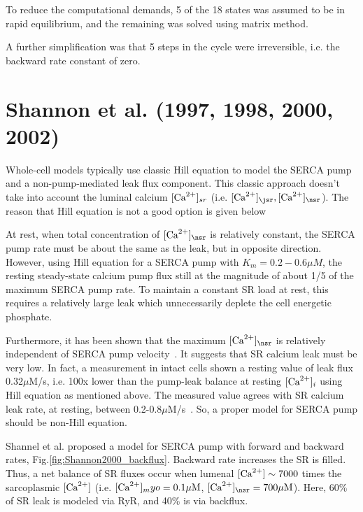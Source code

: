 To reduce the computational demands, 5 of the 18 states was assumed to
be in rapid equilibrium, and the remaining was solved using matrix
method. 

A further simplification was that 5 steps in the cycle were
irreversible, i.e. the backward rate constant of zero. 

\section{Shannon et al. (1997, 1998, 2000, 2002)}
\label{sec:shannon-et-al}

Whole-cell models typically use classic Hill equation to model the SERCA pump
and a non-pump-mediated leak flux component. This classic approach doesn't take
into account the luminal calcium $[{\text{Ca}^{2+}}]_{sr}$ (i.e. $[\Ca]_\jsr,[\Ca]_\nsr$).
The reason that Hill equation is not a good option is given below

\begin{framed}
  At rest, when total concentration of $[\Ca]_\nsr$ is relatively
  constant, the SERCA pump rate must be about the same as the leak,
  but in opposite direction. However, using Hill equation for a SERCA
  pump with $K_m=0.2-0.6\mu M$, the resting steady-state calcium pump
  flux still at the magnitude of about 1/5 of the maximum SERCA pump
  rate. To maintain a constant SR load at rest, this requires a
  relatively large leak which unnecessarily deplete the cell energetic
  phosphate.  
  
  Furthermore, it has been shown that the maximum $[\Ca]_\nsr$ is relatively
  independent of  SERCA pump velocity~\citep{ginsburg1998}. It suggests that SR 
  calcium leak must be very low. In fact, a measurement in intact  cells shown a
  resting value of leak flux 0.32$\mu$M/s, i.e. 100x  lower than the pump-leak
  balance at resting $[{\text{Ca}^{2+}}]_i$ using Hill equation as mentioned above. The
  measured value agrees with SR calcium leak rate, at resting, between
  0.2-0.8$\mu$M/s~\citep{cheng1993cse}. So, a proper model for SERCA pump should
  be non-Hill equation. 
\end{framed}

Shannel et al. proposed a model for SERCA pump with forward and backward rates,
Fig.\ref{fig:Shannon2000_backflux}. Backward rate increases the SR is filled.
Thus, a net balance of SR fluxes occur when lumenal $[{\text{Ca}^{2+}}] \sim 7000$ times the
sarcoplasmic $[{\text{Ca}^{2+}}]$ (i.e.
$[{\text{Ca}^{2+}}]_myo=0.1{\mu\text{M}}$, $[\Ca]_\nsr=700\muM$). Here, 60\% of SR leak is modeled via
RyR, and 40\% is via backflux.

